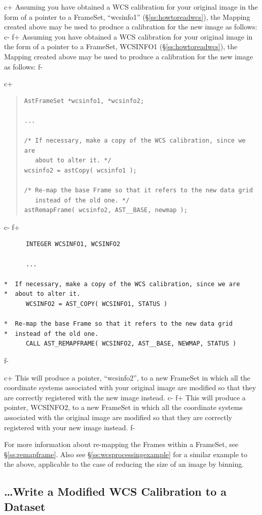 \documentclass[twoside,11pt]{article}
\newcommand{\secref}[1]{\S\ref{#1}}
\newcommand{\secref}[1]{\ref{#1}}
\begin{document}
c+
Assuming you have obtained a WCS calibration for your original image
in the form of a pointer to a FrameSet, ``wcsinfo1''
(\secref{ss:howtoreadwcs}), the Mapping created above may be used to
produce a calibration for the new image as follows:
c-
f+
Assuming you have obtained a WCS calibration for your original image
in the form of a pointer to a FrameSet, WCSINFO1
(\secref{ss:howtoreadwcs}), the Mapping created above may be used to
produce a calibration for the new image as follows:
f-

c+
\begin{quote}
\small
\begin{verbatim}
AstFrameSet *wcsinfo1, *wcsinfo2;

...

/* If necessary, make a copy of the WCS calibration, since we are
   about to alter it. */
wcsinfo2 = astCopy( wcsinfo1 );

/* Re-map the base Frame so that it refers to the new data grid
   instead of the old one. */
astRemapFrame( wcsinfo2, AST__BASE, newmap );
\end{verbatim}
\normalsize
\end{quote}
c-
f+
\small
\begin{verbatim}
      INTEGER WCSINFO1, WCSINFO2

      ...

*  If necessary, make a copy of the WCS calibration, since we are
*  about to alter it.
      WCSINFO2 = AST_COPY( WCSINFO1, STATUS )

*  Re-map the base Frame so that it refers to the new data grid
*  instead of the old one.
      CALL AST_REMAPFRAME( WCSINFO2, AST__BASE, NEWMAP, STATUS )
\end{verbatim}
\normalsize
f-

c+
This will produce a pointer, ``wcsinfo2'', to a new FrameSet in which
all the coordinate systems associated with your original image are
modified so that they are correctly registered with the new image
instead.
c-
f+
This will produce a pointer, WCSINFO2, to a new FrameSet in which all
the coordinate systems associated with the original image are modified
so that they are correctly registered with your new image instead.
f-

For more information about re-mapping the Frames within a FrameSet,
see \secref{ss:remapframe}. Also see \secref{ss:wcsprocessingexample}
for a similar example to the above, applicable to the case of reducing
the size of an image by binning.

\subsection{\label{ss:howtowritewcs}\ldots Write a Modified WCS Calibration to a Dataset}
\end{document}
